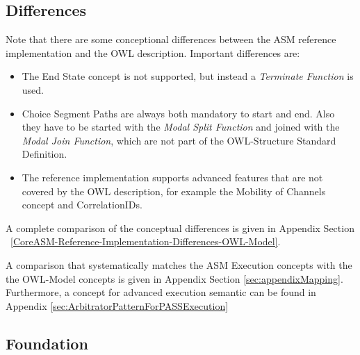 \subsection{Differences}

Note that there are some conceptional differences between the ASM reference implementation and the OWL description. Important differences are:

\begin{itemize}
    \item The End State concept is not supported, but instead a \textit{Terminate Function} is used.
    \item Choice Segment Paths are always both mandatory to start and end. Also they have to be started with the \textit{Modal Split Function} and joined with the \textit{Modal Join Function}, which are not part of the OWL-Structure Standard Definition.
    \item The reference implementation supports advanced features that are not covered by the OWL description, for example the Mobility of Channels concept and CorrelationIDs.
\end{itemize}

A complete comparison of the conceptual differences is given in Appendix Section ~\ref{CoreASM-Reference-Implementation-Differences-OWL-Model}.

A comparison that systematically matches the ASM Execution concepts with the the OWL-Model concepts is given in Appendix Section \ref{sec:appendixMapping}. Furthermore, a concept for advanced execution semantic can be found in Appendix \ref{sec:ArbitratorPatternForPASSExecution}





\subsection{Foundation}

